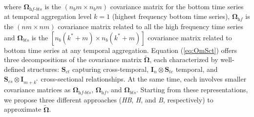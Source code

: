 \documentclass[a4paper,11pt]{article}
\newcommand{\Ivet}{\bm{I}}
\newcommand{\Svet}{\bm{S}}
\newcommand{\Omegavet}{\bm{\Omega}}
\theoremstyle{definition}
\begin{document}
where $\Omegavet_{\textit{hf-bts}}$ is the $(n_b m\times n_b m)$ covariance matrix for the bottom time series at temporal aggregation level $k = 1$ (highest frequency bottom time series), $\Omegavet_{\textit{hf}}$ is the $(nm\times nm)$ covariance matrix related to all the high frequency time series and $\Omegavet_{bts}$ is the $[n_b(k^\ast + m)\times n_b(k^\ast + m)]$ covariance matrix related to bottom time series at any temporal aggregation. Equation (\ref{eq:OmSct}) offers three decompositions of the covariance matrix $\widetilde{\Omegavet}$, each characterized by well-defined structures: $\Svet_{ct}$ capturing cross-temporal, $\Ivet_n \otimes \Svet_{te}$ temporal, and $\Svet_{cs} \otimes \Ivet_{m+k^\ast}$ cross-sectional relationships. At the same time, each involves smaller covariance matrices %
as $\Omegavet_{\textit{hf-bts}}$, $\Omegavet_{\textit{hf}}$, and $\Omegavet_{\textit{bts}}$. Starting from these representations, we propose three different approaches (\textit{HB}, \textit{H}, and \textit{B}, respectively) to approximate $\widetilde{\Omegavet}$.
\end{document}
